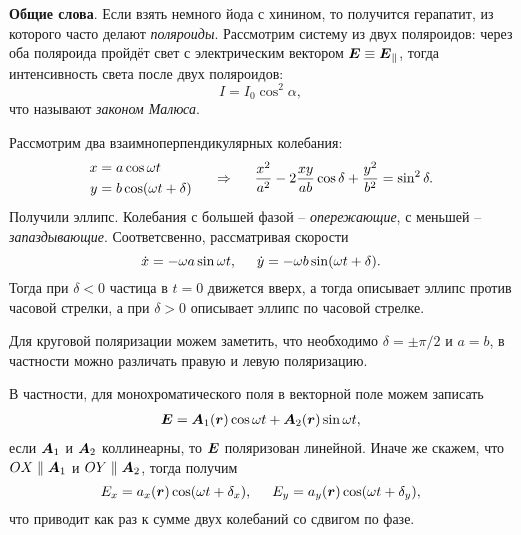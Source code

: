 
\textbf{Общие слова}. 
Если взять немного йода с хинином, то получится герапатит, из которого часто делают \textit{поляроиды}. 
Рассмотрим систему из двух поляроидов: через оба поляроида пройдёт свет с электрическим вектором 
$\mbox{\boldmath $E$} \equiv \mbox{\boldmath $E$}_{\textnormal{$\parallel$}}$, тогда интенсивность света после двух поляроидов:
\begin{equation*}
    I = I_0 \cos^2 \alpha,
\end{equation*}
что называют \textit{законом Малюса}. 

Рассмотрим два взаимноперпендикулярных колебания:
\begin{equation*}
    \left.\begin{aligned}
        x &= a \cos \omega t \\
        y &= b \cos (\omega t + \delta)
    \end{aligned}\right.    
    \hspace{0.5cm} \Rightarrow \hspace{0.5cm}
    \frac{x^2}{a^2} - 2 \frac{xy}{ab} \cos \delta + \frac{y^2}{b^2} = \sin^2 \delta.
\end{equation*}
Получили эллипс. Колебания с большей фазой -- \textit{опережающие},  с меньшей -- \textit{запаздывающие}. Соответсвенно, рассматривая скорости
\begin{equation*}
    \dot{x} = - \omega a \sin \omega t, \hspace{5 mm} 
    \dot{y} = - \omega b \sin(\omega t + \delta).
\end{equation*}
Тогда при $\delta < 0$ частица в $t=0$ движется вверх, а тогда описывает эллипс против часовой стрелки, а при $\delta > 0$ описывает эллипс по часовой стрелке. 

Для круговой поляризации можем заметить, что необходимо $\delta = \pm \pi/2$ и $a = b$, в частности можно различать правую и левую поляризацию. 

В частности, для монохроматического поля в векторной поле можем записать
\begin{align*}
    \mbox{\boldmath $E$} = \mbox{\boldmath $A$}_1(\mbox{\boldmath $r$}) \cos \omega t + \mbox{\boldmath $A$}_2 (\mbox{\boldmath $r$}) \sin \omega t,
\end{align*}
если $\mbox{\boldmath $A$}_1$ и $\mbox{\boldmath $A$}_2$ коллинеарны, то $\mbox{\boldmath $E$}$ поляризован линейной. Иначе же скажем, что $OX \parallel \mbox{\boldmath $A$}_1$ и $OY \parallel \mbox{\boldmath $A$}_2$, тогда получим
\begin{equation*}
     E_x = a_x (\mbox{\boldmath $r$}) \cos (\omega t + \delta_x), \hspace{5 mm} 
     E_y = a_y (\mbox{\boldmath $r$}) \cos (\omega t + \delta_y),
 \end{equation*} 
 что приводит как раз к сумме двух колебаний со сдвигом по фазе. 

